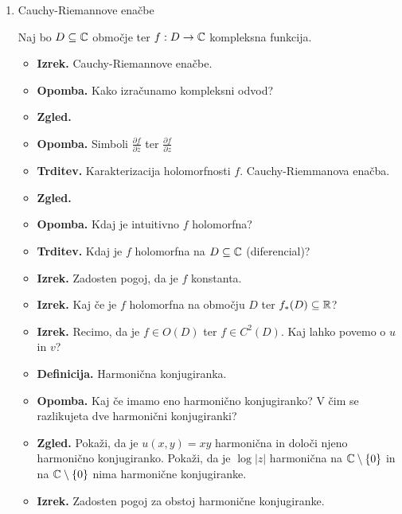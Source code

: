 \begin{enumerate}
    \item Cauchy-Riemannove enačbe
    
    Naj bo \(D \subseteq \mathbb{C}\) območje ter \(f: D \to \mathbb{C}\) kompleksna funkcija.
    \begin{itemize}
        \item \textbf{Izrek.} Cauchy-Riemannove enačbe. 
        \item \textbf{Opomba.} Kako izračunamo kompleksni odvod?
        \item \textbf{Zgled.} 
        \item \textbf{Opomba.} Simboli \(\frac{\partial f}{\partial \overline{z}}\) ter \(\frac{\partial f}{\partial z}\)
        \item \textbf{Trditev.} Karakterizacija holomorfnosti \(f\). Cauchy-Riemmanova enačba.
        \item \textbf{Zgled.} 
        \item \textbf{Opomba.} Kdaj je intuitivno \(f\) holomorfna?
        \item \textbf{Trditev.} Kdaj je \(f\) holomorfna na \(D \subseteq \mathbb{C}\) (diferencial)?
        \item \textbf{Izrek.} Zadosten pogoj, da je \(f\) konstanta.
        \item \textbf{Izrek.} Kaj če je \(f\) holomorfna na območju \(D\) ter \(f_{*}(D) \subseteq \mathbb{R}\)?
        \item \textbf{Izrek.} Recimo, da je \(f \in O(D)\) ter \(f \in C^2(D)\). Kaj lahko povemo o \(u\) in \(v\)?
        \item \textbf{Definicija.} Harmonična konjugiranka.
        \item \textbf{Opomba.} Kaj če imamo eno harmonično konjugiranko? V čim se razlikujeta dve harmonični konjugiranki?
        \item \textbf{Zgled.} Pokaži, da je \(u(x, y) = xy\) harmonična in določi njeno harmonično konjugiranko.  Pokaži, da je \(\log |z|\) harmonična na \(\mathbb{C} \setminus \{0\}\) in na \(\mathbb{C} \setminus \{0\}\) nima harmonične konjugiranke.
        \item \textbf{Izrek.} Zadosten pogoj za obstoj harmonične konjugiranke.
    \end{itemize}


\end{enumerate}
